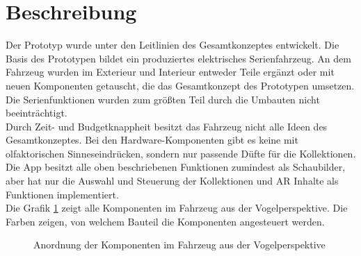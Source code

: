 \section{Beschreibung}
Der Prototyp wurde unter den Leitlinien des Gesamtkonzeptes entwickelt. Die Basis des Prototypen bildet ein produziertes elektrisches Serienfahrzeug. An dem Fahrzeug wurden im Exterieur und Interieur entweder Teile ergänzt oder mit neuen Komponenten getauscht, die das Gesamtkonzept des Prototypen umsetzen. Die Serienfunktionen wurden zum größten Teil durch die Umbauten nicht beeinträchtigt.\\
Durch Zeit- und Budgetknappheit besitzt das Fahrzeug nicht alle Ideen des Gesamtkonzeptes. Bei den Hardware-Komponenten gibt es keine mit olfaktorischen Sinneseindrücken, sondern nur passende Düfte für die Kollektionen. Die App besitzt alle oben beschriebenen Funktionen zumindest als Schaubilder, aber hat nur die Auswahl und Steuerung der Kollektionen und AR Inhalte als Funktionen implementiert. \\
Die Grafik \ref{fig:fahrzeugstruktur} zeigt alle Komponenten im Fahrzeug aus der Vogelperspektive. Die Farben zeigen, von welchem Bauteil die Komponenten angesteuert werden.
\begin{figure}[hbt]
	\centering
	
	\caption[Anordnung der Komponenten im Fahrzeug aus der Vogelperspektive]{Anordnung der Komponenten im Fahrzeug aus der Vogelperspektive}
	\label{fig:fahrzeugstruktur}
\end{figure}
